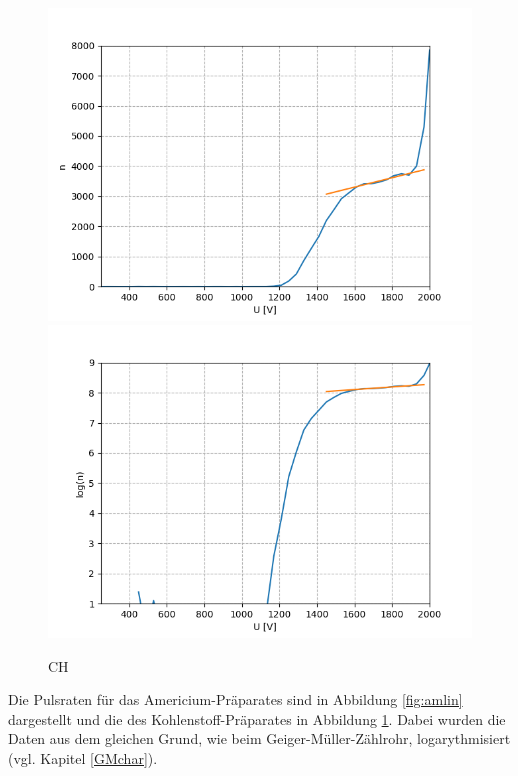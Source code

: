 \documentclass[12pt,a4paper]{article}
\begin{document}
\begin{figure}
\centering
\includegraphics[scale=0.8]{Bilder/Prop/C_lin.PNG}
\includegraphics[scale=0.8]{Bilder/Prop/C_log.PNG}
\caption{CH}
\label{fig:clin}
\end{figure}

Die Pulsraten für das Americium-Präparates sind in Abbildung  \ref{fig:amlin} dargestellt und die des Kohlenstoff-Präparates in Abbildung \ref{fig:clin}. Dabei wurden die Daten aus dem gleichen Grund, wie beim Geiger-Müller-Zählrohr, logarythmisiert (vgl. Kapitel \ref{GMchar}).\\
\end{document}
